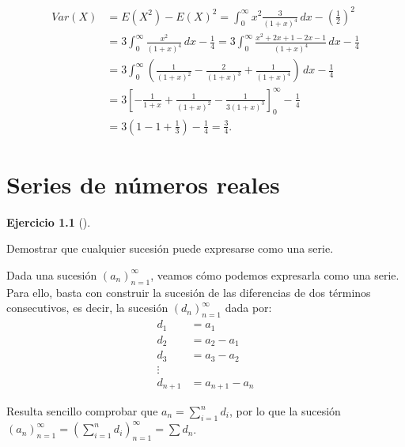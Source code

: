 \documentclass[
  spanish,
  a4paper,
]{scrreport}
\theoremstyle{definition}
\newtheorem{exercise}{Ejercicio}[chapter]
\theoremstyle{remark}
\begin{document}
\begin{tcolorbox}
\begin{enumerate}
  \begin{align*}
  Var(X)
  &= E(X^2) - E(X)^2
  = \int_0^{\infty} x^2\frac{3}{(1+x)^4}\,dx - \left(\frac{1}{2}\right)^2 \\
  &= 3\int_0^{\infty} \frac{x^2}{(1+x)^4}\,dx - \frac{1}{4}
  = 3\int_0^{\infty} \frac{x^2+2x+1-2x-1}{(1+x)^4}\,dx - \frac{1}{4} \\
  &= 3\int_0^{\infty} \left(\frac{1}{(1+x)^2} - \frac{2}{(1+x)^3} + \frac{1}{(1+x)^4}\right)\,dx - \frac{1}{4} \\
  &= 3\left[-\frac{1}{1+x} + \frac{1}{(1+x)^2} - \frac{1}{3(1+x)^3}\right]_0^{\infty} - \frac{1}{4} \\
  &= 3\left(1 - 1 + \frac{1}{3}\right) - \frac{1}{4}
  = \frac{3}{4}.
  \end{align*}
\end{enumerate}

\end{tcolorbox}


\chapter{Series de números reales}\label{series-de-nuxfameros-reales}

\begin{exercise}[]\protect\hypertarget{exr-conversion-sucesiones-series}{}\label{exr-conversion-sucesiones-series}

Demostrar que cualquier sucesión puede expresarse como una serie.

\end{exercise}

\begin{tcolorbox}[enhanced jigsaw, arc=.35mm, bottomrule=.15mm, bottomtitle=1mm, breakable, colback=white, colbacktitle=quarto-callout-tip-color!10!white, colframe=quarto-callout-tip-color-frame, coltitle=black, left=2mm, leftrule=.75mm, opacityback=0, opacitybacktitle=0.6, rightrule=.15mm, title=\textcolor{quarto-callout-tip-color}{\faLightbulb}\hspace{0.5em}{Solución}, titlerule=0mm, toprule=.15mm, toptitle=1mm]

Dada una sucesión \((a_n)_{n=1}^\infty\), veamos cómo podemos expresarla
como una serie. Para ello, basta con construir la sucesión de las
diferencias de dos términos consecutivos, es decir, la sucesión
\((d_n)_{n=1}^\infty\) dada por: \begin{align*}
d_1&=a_1\\ 
d_2&=a_2-a_1\\ 
d_3&=a_3-a_2\\ 
\vdots\\ 
d_{n+1}&=a_{n+1}-a_n
\end{align*}

Resulta sencillo comprobar que \(a_n=\sum_{i=1}^n d_i\), por lo que la
sucesión
\((a_n)_{n=1}^\infty = \left(\sum_{i=1}^n d_i\right)_{n=1}^\infty = \sum d_n\).

\end{tcolorbox}
\end{document}
